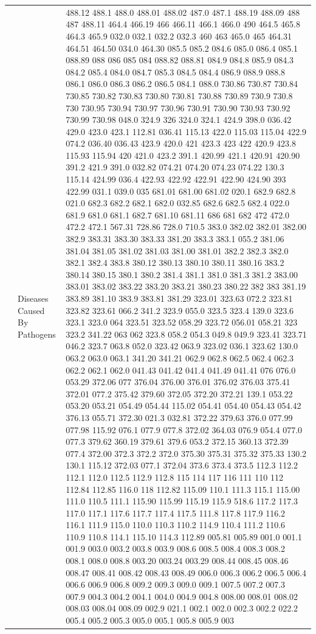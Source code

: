 \documentclass[3p,super,numbers,sort&compress,preprint,10pt]{elsarticle}
\begin{document}
\begin{longtable}{|L{.1in}|L{.6in}||L{5.65in}|}
    & Diseases Caused By Pathogens &  488.12 488.1 488.0 488.01 488.02 487.0 487.1 488.19 488.09 488 487 488.11 464.4 466.19 466 466.11 466.1 466.0 490 464.5 465.8 464.3 465.9 032.0 032.1 032.2 032.3 460 463 465.0 465 464.31 464.51 464.50 034.0 464.30 085.5 085.2 084.6 085.0 086.4 085.1 088.89 088 086 085 084 088.82 088.81 084.9 084.8 085.9 084.3 084.2 085.4 084.0 084.7 085.3 084.5 084.4 086.9 088.9 088.8 086.1 086.0 086.3 086.2 086.5 084.1 088.0 730.86 730.87 730.84 730.85 730.82 730.83 730.80 730.81 730.88 730.89 730.9 730.8 730 730.95 730.94 730.97 730.96 730.91 730.90 730.93 730.92 730.99 730.98 048.0 324.9 326 324.0 324.1 424.9 398.0 036.42 429.0 423.0 423.1 112.81 036.41 115.13 422.0 115.03 115.04 422.9 074.2 036.40 036.43 423.9 420.0 421 423.3 423 422 420.9 423.8 115.93 115.94 420 421.0 423.2 391.1 420.99 421.1 420.91 420.90 391.2 421.9 391.0 032.82 074.21 074.20 074.23 074.22 130.3 115.14 424.99 036.4 422.93 422.92 422.91 422.90 424.90 393 422.99 031.1 039.0 035 681.01 681.00 681.02 020.1 682.9 682.8 021.0 682.3 682.2 682.1 682.0 032.85 682.6 682.5 682.4 022.0 681.9 681.0 681.1 682.7 681.10 681.11 686 681 682 472 472.0 472.2 472.1 567.31 728.86 728.0 710.5 383.0 382.02 382.01 382.00 382.9 383.31 383.30 383.33 381.20 383.3 383.1 055.2 381.06 381.04 381.05 381.02 381.03 381.00 381.01 382.2 382.3 382.0 382.1 382.4 383.8 380.12 380.13 380.10 380.11 380.16 383.2 380.14 380.15 380.1 380.2 381.4 381.1 381.0 381.3 381.2 383.00 383.01 383.02 383.22 383.20 383.21 380.23 380.22 382 383 381.19 383.89 381.10 383.9 383.81 381.29 323.01 323.63 072.2 323.81 323.82 323.61 066.2 341.2 323.9 055.0 323.5 323.4 139.0 323.6 323.1 323.0 064 323.51 323.52 058.29 323.72 056.01 058.21 323 323.2 341.22 063 062 323.8 058.2 054.3 049.8 049.9 323.41 323.71 046.2 323.7 063.8 052.0 323.42 063.9 323.02 036.1 323.62 130.0 063.2 063.0 063.1 341.20 341.21 062.9 062.8 062.5 062.4 062.3 062.2 062.1 062.0 041.43 041.42 041.4 041.49 041.41 076 076.0 053.29 372.06 077 376.04 376.00 376.01 376.02 376.03 375.41 372.01 077.2 375.42 379.60 372.05 372.20 372.21 139.1 053.22 053.20 053.21 054.49 054.44 115.02 054.41 054.40 054.43 054.42 376.13 055.71 372.30 021.3 032.81 372.22 379.63 376.0 077.99 077.98 115.92 076.1 077.9 077.8 372.02 364.03 076.9 054.4 077.0 077.3 379.62 360.19 379.61 379.6 053.2 372.15 360.13 372.39 077.4 372.00 372.3 372.2 372.0 375.30 375.31 375.32 375.33 130.2 130.1 115.12 372.03 077.1 372.04 373.6 373.4 373.5 112.3 112.2 112.1 112.0 112.5 112.9 112.8 115 114 117 116 111 110 112 112.84 112.85 116.0 118 112.82 115.09 110.1 111.3 115.1 115.00 111.0 110.5 111.1 115.90 115.99 115.19 115.9 518.6 117.2 117.3 117.0 117.1 117.6 117.7 117.4 117.5 111.8 117.8 117.9 116.2 116.1 111.9 115.0 110.0 110.3 110.2 114.9 110.4 111.2 110.6 110.9 110.8 114.1 115.10 114.3 112.89 005.81 005.89 001.0 001.1 001.9 003.0 003.2 003.8 003.9 008.6 008.5 008.4 008.3 008.2 008.1 008.0 008.8 003.20 003.24 003.29 008.44 008.45 008.46 008.47 008.41 008.42 008.43 008.49 006.0 006.3 006.2 006.5 006.4 006.6 006.9 006.8 009.2 009.3 009.0 009.1 007.5 007.2 007.3 007.9 004.3 004.2 004.1 004.0 004.9 004.8 008.00 008.01 008.02 008.03 008.04 008.09 002.9 021.1 002.1 002.0 002.3 002.2 022.2 005.4 005.2 005.3 005.0 005.1 005.8 005.9 003 
\end{longtable}
\end{document}
